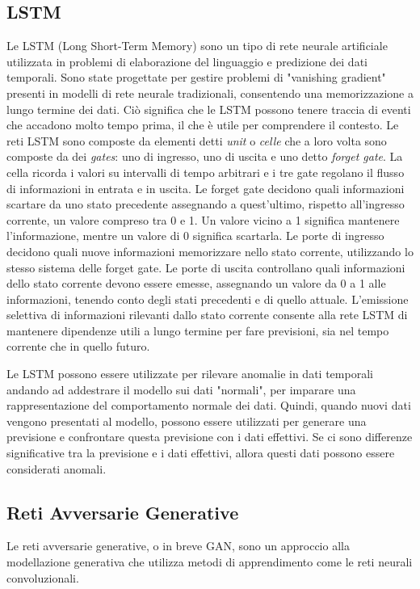 \subsection{LSTM}
Le LSTM (Long Short-Term Memory) sono un tipo di rete neurale artificiale utilizzata in problemi di elaborazione del linguaggio e predizione dei dati temporali. Sono state progettate per gestire problemi di "vanishing gradient" presenti in modelli di rete neurale tradizionali, consentendo una memorizzazione a lungo termine dei dati. Ciò significa che le LSTM possono tenere traccia di eventi che accadono molto tempo prima, il che è utile per comprendere il contesto.
Le reti LSTM sono composte da elementi detti \textit{unit} o \textit{celle} che a loro volta sono composte da dei \textit{gates}: uno di ingresso, uno di uscita e uno detto \textit{forget gate}. La cella ricorda i valori su intervalli di tempo arbitrari e i tre gate regolano il flusso di informazioni in entrata e in uscita. Le forget gate decidono quali informazioni scartare da uno stato precedente assegnando a quest'ultimo, rispetto all'ingresso corrente, un valore compreso tra 0 e 1. Un valore vicino a 1 significa mantenere l'informazione, mentre un valore di 0 significa scartarla. Le porte di ingresso decidono quali nuove informazioni memorizzare nello stato corrente, utilizzando lo stesso sistema delle forget gate. Le porte di uscita controllano quali informazioni dello stato corrente devono essere emesse, assegnando un valore da 0 a 1 alle informazioni, tenendo conto degli stati precedenti e di quello attuale. L'emissione selettiva di informazioni rilevanti dallo stato corrente consente alla rete LSTM di mantenere dipendenze utili a lungo termine per fare previsioni, sia nel tempo corrente che in quello futuro.

Le LSTM possono essere utilizzate per rilevare anomalie in dati temporali andando ad addestrare il modello sui dati "normali", per imparare una rappresentazione del comportamento normale dei dati. Quindi, quando nuovi dati vengono presentati al modello, possono essere utilizzati per generare una previsione e confrontare questa previsione con i dati effettivi. Se ci sono differenze significative tra la previsione e i dati effettivi, allora questi dati possono essere considerati anomali.


\subsection{Reti Avversarie Generative}
Le reti avversarie generative, o in breve GAN, sono un approccio alla modellazione generativa che utilizza metodi di apprendimento come le reti neurali convoluzionali.

